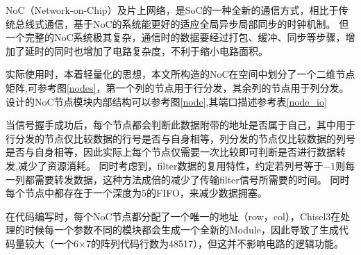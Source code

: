 NoC（Network-on-Chip）及片上网络，是SoC的一种全新的通信方式，相比于传统总线式通信，基于NoC的系统能更好的适应全局异步局部同步的时钟机制。
但一个完整的NoC系统极其复杂，通信时的数据要经过打包、缓冲、同步等步骤，增加了延时的同时也增加了电路复杂度，不利于缩小电路面积。

实际使用时，本着轻量化的思想，本文所构造的NoC在空间中划分了一个二维节点矩阵,可参考图\ref{nodes}，第一个列的节点用于行分发，其余列的节点用于列分发。设计的NoC节点模块内部结构可以参考图\ref{node},其端口描述参考表\ref{node_io}

当信号握手成功后，每个节点都会判断此数据附带的地址是否属于自己，其中用于行分发的节点仅比较数据的行号是否与自身相等，列分发的节点仅比较数据的列号是否与自身相等，因此实际上每个节点仅需要一次比较即可判断是否进行数据转发,减少了资源消耗。
同时考虑到，filter数据的复用特性，约定若列号等于$-1$则每一列都需要转发数据，这种方法成倍的减少了传输filter信号所需要的时间。
同时每个节点中都存在于一个深度为5的FIFO，来减少数据拥塞。

在代码编写时，每个NoC节点都分配了一个唯一的地址（row，col），Chisel3在处理的时候每一个参数不同的模块都会生成一个全新的Module，因此导致了生成代码量较大（一个6×7的阵列代码行数为48517），但这并不影响电路的逻辑功能。

